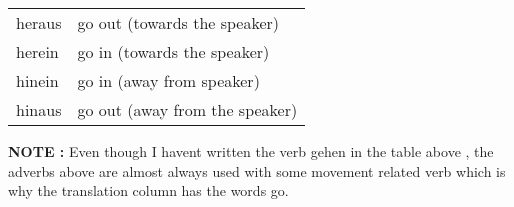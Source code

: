 \documentclass[a4paper,12pt]{article}
\begin{document}
\begin{adjustwidth}{2em}{0pt}
\begin{adjustwidth}{3em}{0pt}
\begin{minipage}{.5\linewidth}
\begin{tabular}{l|l}
\rowcolor{white}     heraus & go out (towards the speaker) \\
\rowcolor{lightgray} herein & go in (towards the speaker)\\
\rowcolor{white}     hinein & go in (away from speaker)\\
\rowcolor{lightgray} hinaus & go out (away from the speaker) \\

\bottomrule
\end{tabular}
\vspace{0.3cm}
\newline
\end{minipage}


\vspace{0.25cm}
\color{flame} \textbf {NOTE :} \color{black} Even though I havent written the
verb gehen in the table above , the adverbs above are almost always used with
some movement related verb which is why the translation column has the words go.


\end{adjustwidth}

\end{adjustwidth}

\end{document}
